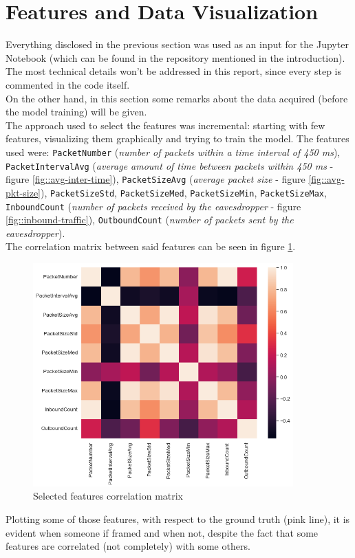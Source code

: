 \documentclass{article}
\begin{document}
\section{Features and Data Visualization}

Everything disclosed in the previous section was used as an input for the Jupyter Notebook (which can be found in the repository mentioned in the introduction). The most technical details won't be addressed in this report, since every step is commented in the code itself. \\ On the other hand, in this section some remarks about the data acquired (before the model training) will be given. \\ The approach used to select the features was incremental: starting with few features, visualizing them graphically and trying to train the model. The features used were: \texttt{PacketNumber} (\textit{number of packets within a time interval of 450 ms}), \texttt{PacketIntervalAvg} (\textit{average amount of time between packets within 450 ms} - figure \ref{fig::avg-inter-time}), \texttt{PacketSizeAvg} (\textit{average packet size} - figure \ref{fig::avg-pkt-size}), \texttt{PacketSizeStd}, \texttt{PacketSizeMed}, \texttt{PacketSizeMin}, \texttt{PacketSizeMax}, \texttt{InboundCount} (\textit{number of packets received by the eavesdropper} - figure \ref{fig::inbound-traffic}), \texttt{OutboundCount} (\textit{number of packets sent by the eavesdropper}). \\ The correlation matrix between said features can be seen in figure \ref{fig::correlation-matrix}.

\begin{figure}[h!]
	\centering
	\includegraphics[width=10cm]{assets/correlation.png}
	\caption{Selected features correlation matrix}
	\label{fig::correlation-matrix}
\end{figure}
Plotting some of those features, with respect to the ground truth (pink line), it is evident when someone if framed and when not, despite the fact that some features are correlated (not completely) with some others.
\end{document}
